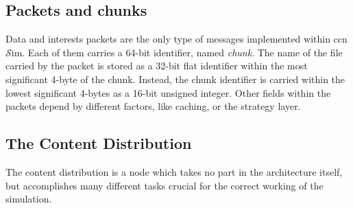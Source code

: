 \documentclass{article}
\newcommand{\ccnsim}{ccn$\mathcal{S}$im}
\begin{document}
\subsection{Packets and chunks}
Data and interests packets are the only type of messages implemented within \ccnsim. Each of them carries a 64-bit identifier, named \emph{chunk}. The name of the file carried by the packet is stored as a 32-bit flat identifier within the most significant 4-byte of the chunk. Instead, the chunk identifier is carried within the lowest significant 4-bytes as a 16-bit unsigned integer. Other fields within the packets depend by different factors, like caching, or the strategy layer.

\subsection{The Content Distribution}
The content distribution is a node which takes no part in the architecture itself, but accomplishes many different tasks crucial for the correct working of the simulation. 
\end{document}
